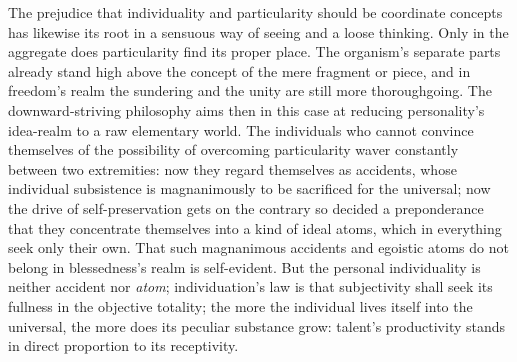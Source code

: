 \documentclass[12pt]{book}
\begin{document}
The prejudice that individuality and particularity should be coordinate
concepts has likewise its root in a sensuous way of seeing and a loose
thinking. Only in the aggregate does particularity find its proper place.
The organism's separate parts already stand high above the concept of the
mere fragment or piece, and in freedom's realm the sundering and the unity
are still more thoroughgoing. The downward-striving philosophy aims then in
this case at reducing personality's idea-realm to a raw elementary world.
The individuals who cannot convince themselves of the possibility of
overcoming particularity waver constantly between two extremities: now they
regard themselves as accidents, whose individual subsistence is
magnanimously to be sacrificed for the universal; now the drive of
self-preservation gets on the contrary so decided a preponderance that they
concentrate themselves into a kind of ideal atoms, which in everything seek
only their own. That such magnanimous accidents and egoistic atoms do not
belong in blessedness's realm is self-evident. But the personal
individuality is neither accident nor \emph{atom}; individuation's law is
that subjectivity shall seek its fullness in the objective totality; the
more the individual lives itself into the universal, the more does its
peculiar substance grow: talent's productivity stands in direct proportion
to its receptivity.
\end{document}
